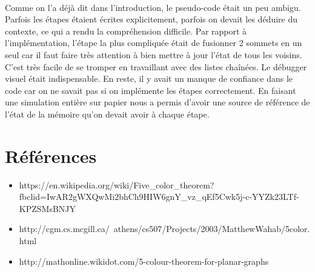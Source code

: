 \documentclass[a4paper, 11pt, oneside]{article}
\begin{document}
	\paragraph{}
	Comme on l'a déjà dit dans l'introduction, le pseudo-code était un peu ambigu. Parfois les étapes étaient écrites explicitement, parfois on devait les déduire du contexte, ce qui a rendu la compréhension difficile. Par rapport à l'implémentation, l'étape la plus compliquée était de fusionner 2 sommets en un seul car il faut faire très attention à bien mettre à jour l'état de tous les voisins. C'est très facile de se tromper en travaillant avec des listes chaînées. Le débugger visuel était indispensable. En reste, il y avait un manque de confiance dans le code car on ne savait pas si on implémente les étapes correctement. En faisant une simulation entière sur papier nous a permis d'avoir une source de référence de l'état de la mémoire qu'on devait avoir à chaque étape.

	\section{Références}
	\begin{itemize}
		\item https://en.wikipedia.org/wiki/Five\_color\_theorem?fbclid=IwAR2gWXQwMi2bhCh9HIW6gnY\_vz\_qEf5Cwk5j-c-YYZk23LTf-KPZSMsBNJY
		\item http://cgm.cs.mcgill.ca/~athens/cs507/Projects/2003/MatthewWahab/5color.html
		\item http://mathonline.wikidot.com/5-colour-theorem-for-planar-graphs
	\end{itemize}
	
\end{document}

